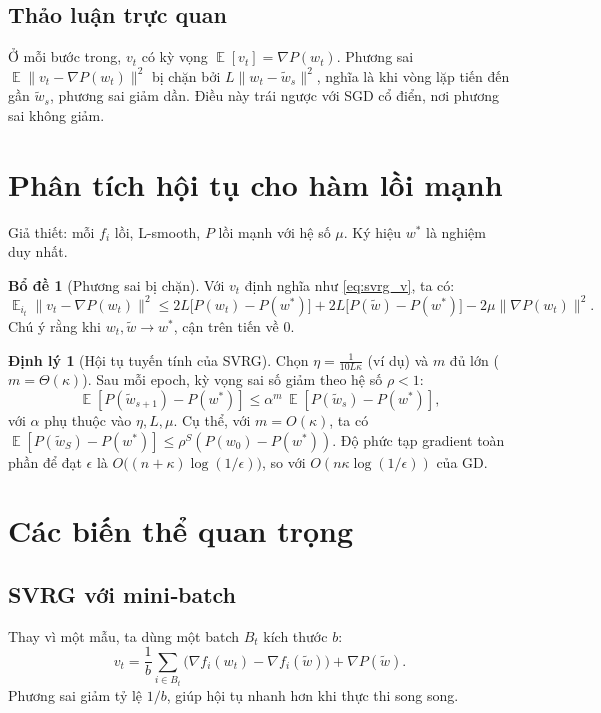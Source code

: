 \documentclass[12pt,a4paper]{report}
\theoremstyle{definition}
\newtheorem{theorem}{Định lý}[chapter]
\newtheorem{lemma}{Bổ đề}[chapter]
\DeclareMathOperator*{\E}{\mathbb{E}}
\begin{document}
\subsection{Thảo luận trực quan}
Ở mỗi bước trong, $v_t$ có kỳ vọng $\E[v_t] = \nabla P(w_t)$. Phương sai $\E\|v_t - \nabla P(w_t)\|^2$ bị chặn bởi $L\|w_t - \tilde{w}_s\|^2$, nghĩa là khi vòng lặp tiến đến gần $\tilde{w}_s$, phương sai giảm dần. Điều này trái ngược với SGD cổ điển, nơi phương sai không giảm.

\section{Phân tích hội tụ cho hàm lồi mạnh}
Giả thiết: mỗi $f_i$ lồi, L-smooth, $P$ lồi mạnh với hệ số $\mu$. Ký hiệu $w^*$ là nghiệm duy nhất.

\begin{lemma}[Phương sai bị chặn]
Với $v_t$ định nghĩa như \eqref{eq:svrg_v}, ta có:
\begin{equation}
\E_{i_t} \|v_t - \nabla P(w_t)\|^2 \le 2L\big[P(w_t) - P(w^*)\big] + 2L\big[P(\tilde{w}) - P(w^*)\big] - 2\mu\|\nabla P(w_t)\|^2.
\label{lem:varbound}
\end{equation}
Chú ý rằng khi $w_t,\tilde{w} \to w^*$, cận trên tiến về 0.
\end{lemma}

\begin{theorem}[Hội tụ tuyến tính của SVRG]
Chọn $\eta = \frac{1}{10 L \kappa}$ (ví dụ) và $m$ đủ lớn ($m = \Theta(\kappa)$). Sau mỗi epoch, kỳ vọng sai số giảm theo hệ số $\rho < 1$:
\begin{equation}
\E[P(\tilde{w}_{s+1}) - P(w^*)] \le \alpha^m \, \E[P(\tilde{w}_s) - P(w^*)],
\end{equation}
với $\alpha$ phụ thuộc vào $\eta, L, \mu$. Cụ thể, với $m = O(\kappa)$, ta có $\E[P(\tilde{w}_S) - P(w^*)] \le \rho^S (P(w_0)-P(w^*))$. Độ phức tạp gradient toàn phần để đạt $\epsilon$ là $O\big((n + \kappa)\log(1/\epsilon)\big)$, so với $O(n\kappa\log(1/\epsilon))$ của GD.
\end{theorem}

\section{Các biến thể quan trọng}
\subsection{SVRG với mini‑batch}
Thay vì một mẫu, ta dùng một batch $B_t$ kích thước $b$:
\begin{equation}
v_t = \frac{1}{b}\sum_{i\in B_t} \big(\nabla f_i(w_t) - \nabla f_i(\tilde{w})\big) + \nabla P(\tilde{w}).
\end{equation}
Phương sai giảm tỷ lệ $1/b$, giúp hội tụ nhanh hơn khi thực thi song song.
\end{document}
